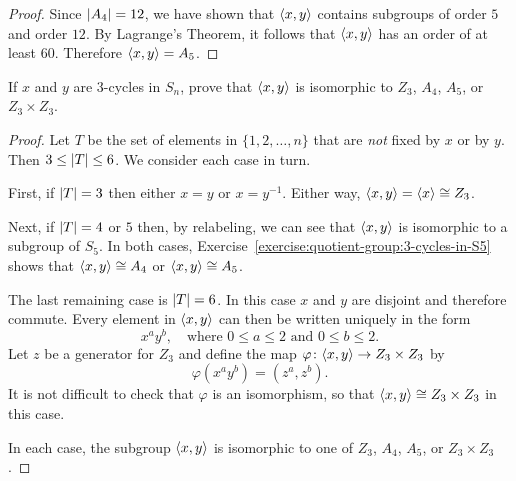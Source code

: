 \begin{enumerate}
\begin{proof}
    Since $\lvert{A_4}\rvert = 12$, we have shown that $\langle{x,y}\rangle$ contains
    subgroups of order $5$ and order $12$. By Lagrange's Theorem, it
    follows that $\langle{x,y}\rangle$ has an order of at least $60$. Therefore
    $\langle{x,y}\rangle = A_5$.
  \end{proof}
\end{enumerate}

 If $x$ and $y$ are $3$-cycles in $S_n$, prove that
$\langle{x,y}\rangle$ is isomorphic to $Z_3$, $A_4$, $A_5$, or $Z_3\times Z_3$.
\begin{proof}
  Let $T$ be the set of elements in $\{1,2,\dots,n\}$ that are {\em
    not} fixed by $x$ or by $y$. Then $3\leq\lvert{T}\rvert\leq6$. We consider
  each case in turn.

  First, if $\lvert{T}\rvert = 3$ then either $x = y$ or $x = y^{-1}$. Either
  way, $\langle{x,y}\rangle = \langle{x}\rangle \cong Z_3$.

  Next, if $\lvert{T}\rvert = 4$ or $5$ then, by relabeling, we can see that
  $\langle{x,y}\rangle$ is isomorphic to a subgroup of $S_5$. In both cases,
  Exercise~\ref{exercise:quotient-group:3-cycles-in-S5} shows that
  $\langle{x,y}\rangle\cong A_4$ or $\langle{x,y}\rangle\cong A_5$.

  The last remaining case is $\lvert{T}\rvert = 6$. In this case $x$ and $y$
  are disjoint and therefore commute. Every element in $\langle{x,y}\rangle$ can
  then be written uniquely in the form
  \begin{equation*}
    x^ay^b, \quad \text{where $0\leq a\leq2$ and $0\leq b\leq2$.}
  \end{equation*}
  Let $z$ be a generator for $Z_3$ and define the map
  $\varphi\colon\langle{x,y}\rangle\to Z_3\times Z_3$ by
  \begin{equation*}
    \varphi(x^ay^b) = (z^a, z^b).
  \end{equation*}
  It is not difficult to check that $\varphi$ is an isomorphism, so
  that $\langle{x,y}\rangle\cong Z_3\times Z_3$ in this case.

  In each case, the subgroup $\langle{x,y}\rangle$ is isomorphic to one of
  $Z_3$, $A_4$, $A_5$, or $Z_3\times Z_3$.
\end{proof}
